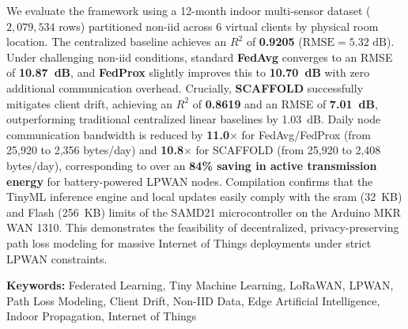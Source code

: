 We evaluate the framework using a 12-month indoor multi-sensor dataset ($2,079,534$ rows) partitioned non-\gls{iid} across 6 virtual clients by physical room location. The centralized baseline achieves an $R^2$ of \textbf{0.9205} ($\text{RMSE} = 5.32\text{~dB}$). Under challenging non-\gls{iid} conditions, standard \textbf{FedAvg} converges to an RMSE of \textbf{10.87~dB}, and \textbf{FedProx} slightly improves this to \textbf{10.70~dB} with zero additional communication overhead. Crucially, \textbf{SCAFFOLD} successfully mitigates client drift, achieving an $R^2$ of \textbf{0.8619} and an RMSE of \textbf{7.01~dB}, outperforming traditional centralized linear baselines by 1.03~dB. Daily node communication bandwidth is reduced by \textbf{11.0$\times$} for FedAvg/FedProx (from 25,920 to 2,356 bytes/day) and \textbf{10.8$\times$} for SCAFFOLD (from 25,920 to 2,408 bytes/day), corresponding to over an \textbf{84\% saving in active transmission energy} for battery-powered LPWAN nodes. Compilation confirms that the TinyML inference engine and local updates easily comply with the \gls{sram} (32~KB) and Flash (256~KB) limits of the SAMD21 microcontroller on the Arduino MKR WAN 1310. This demonstrates the feasibility of decentralized, privacy-preserving path loss modeling for massive Internet of Things deployments under strict LPWAN constraints.

\noindent\textbf{Keywords:} Federated Learning, Tiny Machine Learning, LoRaWAN, LPWAN, Path Loss Modeling, Client Drift, Non-IID Data, Edge Artificial Intelligence, Indoor Propagation, Internet of Things
